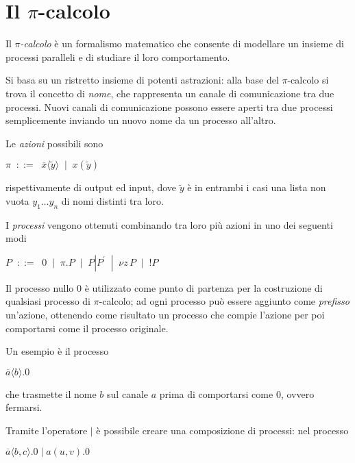 \section{Il \texorpdfstring{$\pi$}{pi}-calcolo}

Il \emph{$\pi$-calcolo} \`e un formalismo matematico che consente di
modellare un insieme di processi paralleli e di studiare il loro
comportamento.

Si basa su un ristretto insieme di potenti astrazioni: alla base del
$\pi$-calcolo si trova il concetto di \emph{nome}, che rappresenta un
canale di comunicazione tra due processi. Nuovi canali di comunicazione
possono essere aperti tra due processi semplicemente inviando un nuovo
nome da un processo all'altro.

Le \emph{azioni} possibili sono

\begin{pilisting}
$
    \pi \;\; ::= \;\; \overline{x}\langle\tilde{y}\rangle
        \;\; |   \;\; x(\tilde{y})
$
\end{pilisting}

rispettivamente di output ed input, dove $\tilde{y}$ \`e in entrambi i casi
una lista non vuota $ y_1 \ldots y_n$ di nomi distinti tra loro.

I \emph{processi} vengono ottenuti combinando tra loro pi\`u azioni in uno
dei seguenti modi

\begin{pilisting}
$
    P \;\; ::= \;\; 0
      \;\; |   \;\; \pi.P
      \;\; |   \;\; P|P^{'}
      \;\; |   \;\; \nu z \, P
      \;\; |   \;\; !P
$
\end{pilisting}

Il processo nullo $0$ \`e utilizzato come punto di partenza per la
costruzione di qualsiasi processo di $\pi$-calcolo; ad ogni processo pu\`o
essere aggiunto come \emph{prefisso} un'azione, ottenendo come risultato un
processo che compie l'azione per poi comportarsi come il processo originale.

Un esempio \`e il processo

\begin{pilisting}
$
    \overline{a}\langle b\rangle.0
$
\end{pilisting}

che trasmette il nome $b$ sul canale $a$ prima di comportarsi come $0$,
ovvero fermarsi.

Tramite l'operatore $|$ \`e possibile creare una composizione di processi:
nel processo

\begin{pilisting}
$
    \overline{a}\langle b,c\rangle.0 \; | \;
    a(u,v).0
$
\end{pilisting}

